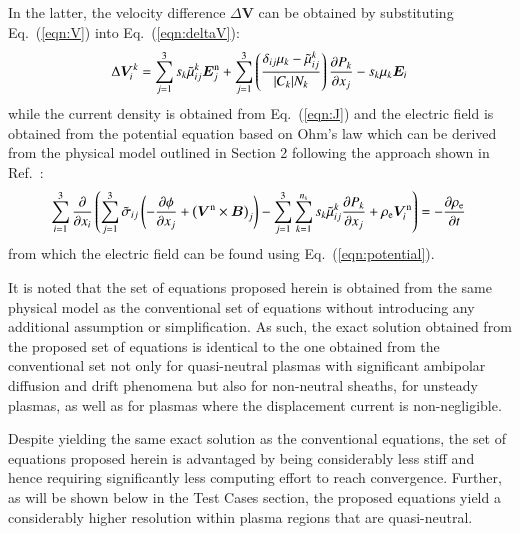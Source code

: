 \documentclass[twoside,onecolumn,10pt]{waflarticle}
\renewcommand{\vec}[1]{\bm{#1}}
\newcommand{\mfd}{\displaystyle}
\newcommand{\ns}{{n_{\rm s}}}
\newcommand{\nd}{3}
\renewcommand{\vec}[1]{\bm{ #1 }}
\begin{document}
%
In the latter, the velocity difference $\Delta \vec{V}$ can be obtained by substituting Eq.\ (\ref{eqn:V}) into Eq.\ (\ref{eqn:deltaV}):
%
\begin{equation}
 \Delta \vec{V}_i^k = 
   \sum_{j=1}^\nd s_k \wtilde{\mu}^k_{ij}  \vec{E}_j^{\rm n}
      + \sum_{j=1}^\nd  \left(\frac{\delta_{ij} \mu_k-\wtilde{\mu}^{k}_{ij}}{|C_k| N_k}\right) \frac{\partial P_k}{\partial x_j}
-  s_k \mu_k  \vec{E}_i
\end{equation}
%
while the current density is obtained from Eq.\ (\ref{eqn:J}) and the electric field is obtained from the potential equation based on Ohm's law which can be derived from the physical model outlined in Section 2 following the approach shown in Ref.\ \cite{jcp:2011:parent}: 
%
\begin{equation}
\!\begin{array}{l}
  \mfd\sum_{i=1}^3 \frac{\partial}{\partial x_i}\left(\sum_{j=1}^3 \wtilde{\sigma}_{ij} \left(-\frac{\partial \phi}{\partial x_j}  + \left(\vec{V}^{\rm n} \times \vec{B}\right)_j\right) 
             - \sum_{j=1}^3 \sum_{k=1}^\ns s_k   \wtilde{\mu}^{k}_{ij}  \frac{\partial P_k}{\partial x_j}
              + \rho_{\rm e} \vec{V}_i^{\rm n}  \right)=-  \frac{\partial \rho_{\rm e}}{\partial t}
\end{array}
\end{equation}
%
from which the electric field can be found using Eq.\ (\ref{eqn:potential}).

It is noted that the set of equations proposed herein is obtained from the same physical model as the conventional set of equations without introducing any additional assumption or simplification. As such, the exact solution obtained from the proposed set of equations is identical to the one obtained from the conventional set not only for quasi-neutral plasmas with significant ambipolar diffusion and drift phenomena but also for non-neutral sheaths, for unsteady plasmas, as well as for plasmas where the displacement current is non-negligible. 

Despite yielding the same exact solution as the conventional equations, the set of equations proposed herein is advantaged  by being considerably less stiff and hence requiring significantly less computing effort to reach convergence. Further, as will be shown below in the Test Cases section, the proposed equations yield a considerably higher resolution within plasma regions that are quasi-neutral.    
\end{document}
